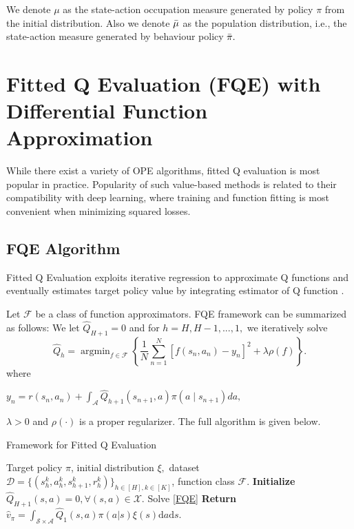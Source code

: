 \documentclass{article}
\numberwithin{equation}{section}
\theoremstyle{plain}
\theoremstyle{definition}
\theoremstyle{remark}
\begin{document}
We denote $\mu$ as the state-action occupation measure generated by policy $\pi$ from the initial distribution. Also we denote $\Bar{\mu}$ as the population distribution, i.e., the state-action measure generated by behaviour policy $\Bar{\pi}.$ 

\section{Fitted Q Evaluation (FQE) with Differential Function Approximation}
\label{sec:fqe}

While there exist a variety of OPE algorithms, fitted Q evaluation is most popular in practice. Popularity of such value-based methods is related to their compatibility with deep learning, where training and function fitting is most convenient when minimizing squared losses. 
\subsection{FQE Algorithm}
Fitted Q Evaluation exploits iterative regression to approximate Q functions and eventually estimates target policy value by integrating estimator of Q function \citep{le2019batch, fonteneau2013batch}. 

Let $\mathcal{F}$ be a class of function approximators. FQE framework can be summarized as follows: We let $\widehat{Q}_{H+1} = 0$ and for $h = H,H-1,...,1,$ we iteratively solve
\begin{equation}\label{FQE}
    \widehat{Q}_h = \mathop{\arg \min}_{f \in \mathcal{F}} \left\{ \frac{1}{N} \sum_{n=1}^N \left[f(s_n,a_n) - y_n\right]^2 + \lambda \rho(f)\right\}.
\end{equation}
where \begin{small}$y_n = r(s_n,a_n) +  \int_{\mathcal{A}} \widehat{Q}_{h+1}(s_{n+1},a) \pi(a \mid s_{n+1}) d a,$\end{small} $\lambda > 0$ and $\rho(\cdot)$ is a proper regularizer. 
The full algorithm is given below.
\begin{algorithm}[htb!]
\caption{Framework for Fitted Q Evaluation}
\label{alg1}
	\begin{algorithmic}[1] 
		\Require Target policy $\pi$, initial distribution $\xi,$ dataset $\mathcal{D}=\{(s^{k}_h,a^{k}_h,s^{k}_{h+1},r^{k}_h)\}_{h\in[H],k\in[K]}$, function class $\mathcal{F}.$
		\State \textbf{Initialize } $\widehat{Q}_{H+1}(s,a) = 0,\forall (s,a)\in\mathcal{X}.$
		\State Solve \eqref{FQE}
		\EndFor
		\State \textbf{Return} $\widehat{v}_\pi = \int_{\mathcal{S} \times \mathcal{A}} \widehat{Q}_1(s,a) \pi(a|s) \xi(s) \mathrm{d} a \mathrm{d} s.$
	\end{algorithmic}
\end{algorithm}
\end{document}

